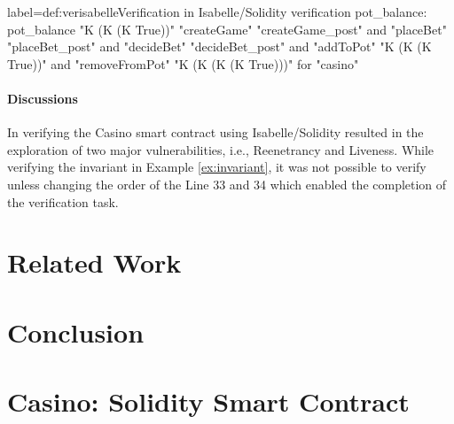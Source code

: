 \documentclass[a4paper,UKenglish,cleveref, autoref, thm-restate]{oasics-v2021}
\begin{document}
\begin{code}{label={def:ver}}{isabelle}{Verification in Isabelle/Solidity}
verification pot_balance:
   pot_balance
  "K (K (K True))"
  "createGame" "createGame_post" and
  "placeBet" "placeBet_post" and
  "decideBet" "decideBet_post" and
  "addToPot" "K (K (K True))" and
  "removeFromPot" "K (K (K (K True)))"
  for "casino"
\end{code}
\paragraph*{Discussions}
In verifying the Casino smart contract using Isabelle/Solidity resulted in the exploration of two major vulnerabilities, i.e., Reenetrancy and  Liveness.
%
While verifying the invariant in Example \autoref{ex:invariant},  it was not possible to verify unless changing the order of the Line 33 and 34 which enabled the completion of the verification task.
%

\section{Related Work}
%
\section{Conclusion}
%

%
\nocite{*}


\appendix

\section{Casino: Solidity Smart Contract}\label{sec:app1}
\end{document}
